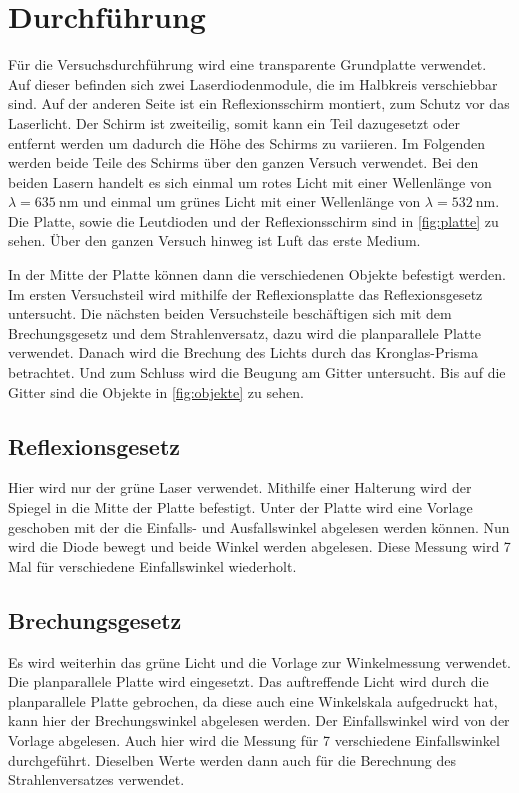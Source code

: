 \section{Durchführung}
\label{sec:Durchführung}
    Für die Versuchsdurchführung wird eine transparente Grundplatte verwendet.
    Auf dieser befinden sich zwei Laserdiodenmodule, die im Halbkreis verschiebbar sind.
    Auf der anderen Seite ist ein Reflexionsschirm montiert, zum Schutz vor das Laserlicht.
    Der Schirm ist zweiteilig, somit kann ein Teil dazugesetzt oder entfernt werden um dadurch die Höhe des Schirms zu variieren.
    Im Folgenden werden beide Teile des Schirms über den ganzen Versuch verwendet.
    Bei den beiden Lasern handelt es sich einmal um rotes Licht mit einer Wellenlänge von $\lambda = \SI{635}{\nano\metre}$ und einmal
    um grünes Licht mit einer Wellenlänge von $\lambda = \SI{532}{\nano\metre}$.
    Die Platte, sowie die Leutdioden und der Reflexionsschirm sind in \autoref{fig:platte} zu sehen.
    Über den ganzen Versuch hinweg ist Luft das erste Medium.
    
    \noindent
    In der Mitte der Platte können dann die verschiedenen Objekte befestigt werden.
    Im ersten Versuchsteil wird mithilfe der Reflexionsplatte das Reflexionsgesetz untersucht.
    Die nächsten beiden Versuchsteile beschäftigen sich mit dem Brechungsgesetz und dem Strahlenversatz, dazu wird die planparallele Platte verwendet.
    Danach wird die Brechung des Lichts durch das Kronglas-Prisma betrachtet.
    Und zum Schluss wird die Beugung am Gitter untersucht.
    Bis auf die Gitter sind die Objekte in \autoref{fig:objekte} zu sehen.

    \subsection{Reflexionsgesetz}
        Hier wird nur der grüne Laser verwendet.
        Mithilfe einer Halterung wird der Spiegel in die Mitte der Platte befestigt.
        Unter der Platte wird eine Vorlage geschoben mit der die Einfalls- und Ausfallswinkel abgelesen werden können.
        Nun wird die Diode bewegt und beide Winkel werden abgelesen.
        Diese Messung wird 7 Mal für verschiedene Einfallswinkel wiederholt.

    \subsection{Brechungsgesetz}
        Es wird weiterhin das grüne Licht und die Vorlage zur Winkelmessung verwendet.
        Die planparallele Platte wird eingesetzt.
        Das auftreffende Licht wird durch die planparallele Platte gebrochen, da diese auch eine Winkelskala aufgedruckt hat, kann hier der Brechungswinkel abgelesen werden.
        Der Einfallswinkel wird von der Vorlage abgelesen.
        Auch hier wird die Messung für 7 verschiedene Einfallswinkel durchgeführt.
        Dieselben Werte werden dann auch für die Berechnung des Strahlenversatzes verwendet.

